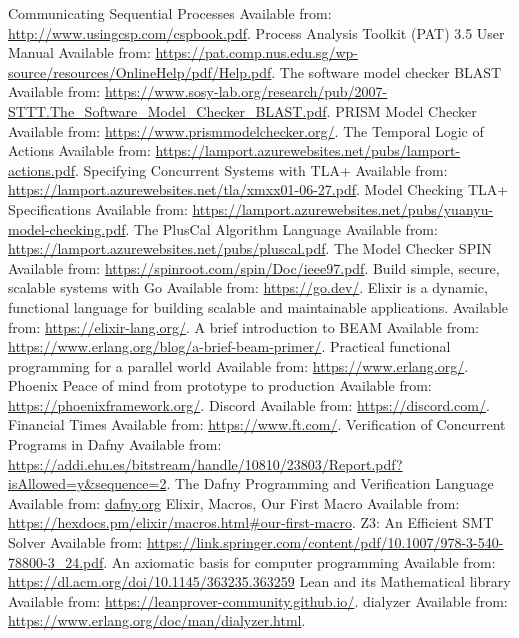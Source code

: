 \begin{thebibliography}{9}
Communicating Sequential Processes
Available from: \url{http://www.usingcsp.com/cspbook.pdf}.
Process Analysis Toolkit (PAT) 3.5 User
Manual
Available from: \url{https://pat.comp.nus.edu.sg/wp-source/resources/OnlineHelp/pdf/Help.pdf}.
The software model checker BLAST
Available from: \url{https://www.sosy-lab.org/research/pub/2007-STTT.The_Software_Model_Checker_BLAST.pdf}.
PRISM Model Checker
Available from: \url{https://www.prismmodelchecker.org/}.
The Temporal Logic of Actions
Available from: \url{https://lamport.azurewebsites.net/pubs/lamport-actions.pdf}.
Specifying Concurrent Systems with TLA+
Available from: \url{https://lamport.azurewebsites.net/tla/xmxx01-06-27.pdf}.
Model Checking TLA+ Specifications
Available from: \url{https://lamport.azurewebsites.net/pubs/yuanyu-model-checking.pdf}.
The PlusCal Algorithm Language
Available from: \url{https://lamport.azurewebsites.net/pubs/pluscal.pdf}.
The Model Checker SPIN
Available from: \url{https://spinroot.com/spin/Doc/ieee97.pdf}.
Build simple, secure, scalable systems with Go
Available from: \url{https://go.dev/}.
Elixir is a dynamic, functional language for building scalable and maintainable applications.
Available from: \url{https://elixir-lang.org/}.
A brief introduction to BEAM
Available from: \url{https://www.erlang.org/blog/a-brief-beam-primer/}.
Practical functional programming for a parallel world
Available from: \url{https://www.erlang.org/}.
Phoenix Peace of mind from prototype to production
Available from: \url{https://phoenixframework.org/}.
Discord
Available from: \url{https://discord.com/}.
Financial Times
Available from: \url{https://www.ft.com/}.
Verification of Concurrent Programs in Dafny
Available from: \url{https://addi.ehu.es/bitstream/handle/10810/23803/Report.pdf?isAllowed=y&sequence=2}.
The Dafny Programming and Verification Language
Available from: \url{dafny.org}
Elixir, Macros, Our First Macro
Available from: \url{https://hexdocs.pm/elixir/macros.html#our-first-macro}.
Z3: An Efficient SMT Solver
Available from: \url{https://link.springer.com/content/pdf/10.1007/978-3-540-78800-3_24.pdf}.
An axiomatic basis for computer programming
Available from: \url{https://dl.acm.org/doi/10.1145/363235.363259}
Lean and its Mathematical library
Available from: \url{https://leanprover-community.github.io/}.
dialyzer
Available from: \url{https://www.erlang.org/doc/man/dialyzer.html}.
\end{thebibliography}